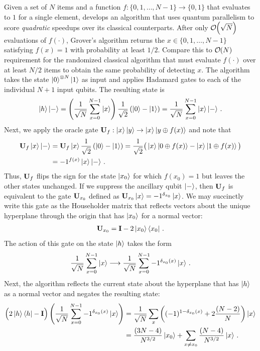 \documentclass[12pt]{article} %
\newcommand{\order}[1]{{\cal O}\hspace{-0.2em}\left( #1 \right)}
\begin{document}
Given a set of $N$ items and a function $f:\{0,1,\dots,N-1\}\rightarrow \{0,1\}$ that evaluates to $1$ for a single element, \citet{grover1996fast} develops an algorithm that uses quantum parallelism to score \emph{quadratic} speedups over its classical counterparts. After only $\order{\sqrt{N}}$ evaluations of $f(\cdot)$, Grover's algorithm returns the $x\in \{0,1,\dots,N-1\}$ satisfying $f(x) =1$ with probability at least $1/2$.  Compare this to $\order{N}$ requirement for the randomized classical algorithm that must evaluate $f(\cdot)$ over at least $N/2$ items to obtain the same probability of detecting $x$.  The algorithm takes the state $\ket{0}^{\otimes N}\ket{1}$ as input and applies Hadamard gates to each of the individual $N+1$ input qubits.  The resulting state is 
\begin{align*}
\ket{h}\ket{-}= \left(\frac{1}{\sqrt{N}} \sum_{x=0}^{N-1} \ket{x} \right)  \frac{1}{\sqrt{2}}\left(\ket{0} -\ket{1}\right) =  \frac{1}{\sqrt{N}} \sum_{x=0}^{N-1} \ket{x} \ket{-} \, .
\end{align*}
Next, we apply the oracle gate $\mathbf{U}_f: \ket{x}\ket{y} \rightarrow \ket{x}\ket{y\oplus f(x)}$ and note that 
\begin{align*}
\mathbf{U}_f \ket{x} \ket{-} &= \mathbf{U}_f \ket{x} \frac{1}{\sqrt{2}}\left(\ket{0} -\ket{1}\right) 
= \frac{1}{\sqrt{2}} \big(\ket{x} \ket{0\oplus f(x)} - \ket{x}\ket{1\oplus f(x)} \big) \\
&= -1^{f(x)} \ket{x}\ket{-}  \, .
\end{align*}
Thus, $\mathbf{U}_f$ flips the sign for the state $\ket{x_0}$ for which $f(x_0)=1$ but leaves the other states unchanged.  If we suppress the ancillary qubit $\ket{-}$, then $\mathbf{U}_f$ is equivalent to the gate $\mathbf{U}_{x_0}$ defined as $\mathbf{U}_{x_0} \ket{x} = -1^{\delta_{x_0}}\ket{x}$. We may succinctly write this gate as the Householder matrix that reflects vectors about the unique hyperplane through the origin that has $\ket{x_0}$ for a normal vector:
\begin{align*}
\mathbf{U}_{x_0}= \mathbf{I} - 2 \ket{x_0}\bra{x_0} \, .
\end{align*}
The action of this gate on the state $\ket{h}$ takes the form
\begin{align*}
\frac{1}{\sqrt{N}} \sum_{x=0}^{N-1} \ket{x} \longrightarrow \frac{1}{\sqrt{N}} \sum_{x=0}^{N-1} -1^{\delta_{x_0}(x)} \ket{x} \, .
\end{align*}
Next, the algorithm reflects the current state about the hyperplane that has $\ket{h}$ as a normal vector and negates the resulting state:
\begin{align*}
\Big(2\ket{h}\bra{h}-\mathbf{I} \Big) \left( \frac{1}{\sqrt{N}} \sum_{x=0}^{N-1} -1^{\delta_{x_0}(x)} \ket{x}  \right)
&= \frac{1}{\sqrt{N}}\sum_{x} \left( (-1)^{1-\delta_{x_0}(x)} + 2 \frac{(N-2)}{N} \right)\ket{x}\\ &= \frac{(3N-4)}{N^{3/2}} \ket{x_0} + \sum_{x\neq x_0} \frac{(N-4)}{N^{3/2}}  \ket{x} \, .
\end{align*}
\end{document}
